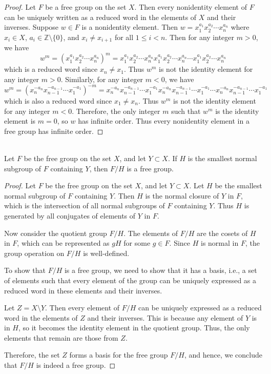 \documentclass{article}
\def\zz{{\mathbb Z}}
\begin{document}
\begin{proof}
    Let $F$ be a free group on the set $X$. Then every nonidentity element of $F$ can be uniquely written as a reduced word in the elements of $X$ and their inverses. Suppose $w \in F$ is a nonidentity element. Then $w = x_1^{a_1} x_2^{a_2} \cdots x_n^{a_n}$ where $x_i \in X$, $a_i \in \zz \setminus \{0\}$, and $x_i \neq x_{i+1}$ for all $1 \leq i < n$. Then for any integer $m > 0$, we have
    \[
        w^m = (x_1^{a_1} x_2^{a_2} \cdots x_n^{a_n})^m = x_1^{a_1} x_2^{a_2} \cdots x_n^{a_n} x_1^{a_1} x_2^{a_2} \cdots x_n^{a_n} \cdots x_1^{a_1} x_2^{a_2} \cdots x_n^{a_n}
    \]
    which is a reduced word since $x_n \neq x_1$. Thus $w^m$ is not the identity element for any integer $m > 0$. Similarly, for any integer $m < 0$, we have
    \[
        w^m = (x_n^{-a_n} x_{n-1}^{-a_{n-1}} \cdots x_1^{-a_1})^{-m} = x_n^{-a_n} x_{n-1}^{-a_{n-1}} \cdots x_1^{-a_1} x_n^{-a_n} x_{n-1}^{-a_{n-1}} \cdots x_1^{-a_1} \cdots x_n^{-a_n} x_{n-1}^{-a_{n-1}} \cdots x_1^{-a_1}
    \]
    which is also a reduced word since $x_1 \neq x_n$. Thus $w^m$ is not the identity element for any integer $m < 0$. Therefore, the only integer $m$ such that $w^m$ is the identity element is $m = 0$, so $w$ has infinite order. Thus every nonidentity element in a free group has infinite order.
\end{proof}




\begin{problem}[1.9.4] \\ 
    Let $F$ be the free group on the set $X$, and let $Y \subset X$. If $H$ is the smallest normal subgroup of $F$ containing $Y$, then $F/H$ is a free group.
\end{problem}

\begin{proof}
    Let $F$ be the free group on the set $X$, and let $Y \subset X$. Let $H$ be the smallest normal subgroup of $F$ containing $Y$. Then $H$ is the normal closure of $Y$ in $F$, which is the intersection of all normal subgroups of $F$ containing $Y$. Thus $H$ is generated by all conjugates of elements of $Y$ in $F$. 

    Now consider the quotient group $F/H$. The elements of $F/H$ are the cosets of $H$ in $F$, which can be represented as $gH$ for some $g \in F$. Since $H$ is normal in $F$, the group operation on $F/H$ is well-defined. 

    To show that $F/H$ is a free group, we need to show that it has a basis, i.e., a set of elements such that every element of the group can be uniquely expressed as a reduced word in these elements and their inverses. 

    Let $Z = X \setminus Y$. Then every element of $F/H$ can be uniquely expressed as a reduced word in the elements of $Z$ and their inverses. This is because any element of $Y$ is in $H$, so it becomes the identity element in the quotient group. Thus, the only elements that remain are those from $Z$. 

    Therefore, the set $Z$ forms a basis for the free group $F/H$, and hence, we conclude that $F/H$ is indeed a free group.
\end{proof}
\end{document}
